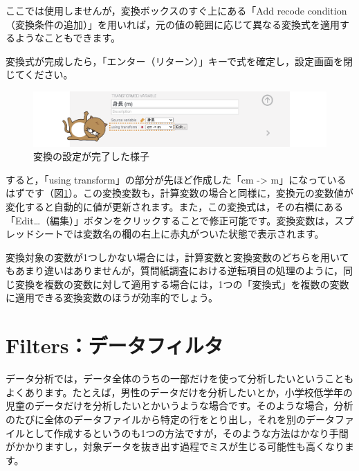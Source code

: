 \documentclass[
  12pt,
  a5jpaper,
  lualatex, ja=standard]{bxjsbook}
\begin{document}
ここでは使用しませんが，変換ボックスのすぐ上にある「Add recode condition（変換条件の追加）」を用いれば，元の値の範囲に応じて異なる変換式を適用するようなこともできます。

変換式が完成したら，「エンター（リターン）」キーで式を確定し，設定画面を閉じてください。

\begin{figure}[!ht]

{\centering \includegraphics[width=1\linewidth]{images/basics/data-transformed-transform-recoded} 

}

\caption{変換の設定が完了した様子}\label{fig:data-transformed-transform-recoded}
\end{figure}

すると，「using transform」の部分が先ほど作成した「cm -\textgreater{} m」になっているはずです（図\ref{fig:data-transformed-transform-recoded}）。この変換変数も，計算変数の場合と同様に，変換元の変数値が変化すると自動的に値が更新されます。また，この変換式は，その右横にある「Edit\ldots（編集）」ボタンをクリックすることで修正可能です。変換変数は，スプレッドシートでは変数名の欄の右上に赤丸がついた状態で表示されます。

変換対象の変数が1つしかない場合には，計算変数と変換変数のどちらを用いてもあまり違いはありませんが，質問紙調査における逆転項目の処理のように，同じ変換を複数の変数に対して適用する場合には，1つの「変換式」を複数の変数に適用できる変換変数のほうが効率的でしょう。

\hypertarget{sec:data-filter}{%
\section{Filters：データフィルタ}\label{sec:data-filter}}

データ分析では，データ全体のうちの一部だけを使って分析したいということもよくあります。たとえば，男性のデータだけを分析したいとか，小学校低学年の児童のデータだけを分析したいとかいうような場合です。そのような場合，分析のたびに全体のデータファイルから特定の行をとり出し，それを別のデータファイルとして作成するというのも1つの方法ですが，そのような方法はかなり手間がかかりますし，対象データを抜き出す過程でミスが生じる可能性も高くなります。
\end{document}
